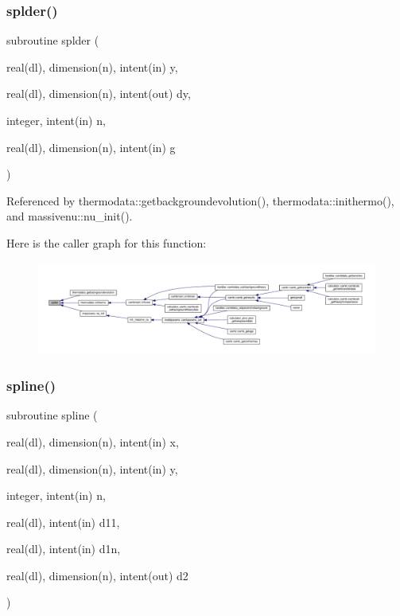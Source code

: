 \mbox{\label{subroutines_8f90_ac08193bbb8f878a435cf0e52c491ad9c}} 
\subsubsection{\texorpdfstring{splder()}{splder()}}
{\footnotesize\ttfamily subroutine splder (\begin{DoxyParamCaption}\item[{real(dl), dimension(n), intent(in)}]{y,  }\item[{real(dl), dimension(n), intent(out)}]{dy,  }\item[{integer, intent(in)}]{n,  }\item[{real(dl), dimension(n), intent(in)}]{g }\end{DoxyParamCaption})}



Referenced by thermodata\+::getbackgroundevolution(), thermodata\+::inithermo(), and massivenu\+::nu\+\_\+init().

Here is the caller graph for this function\+:
\nopagebreak
\begin{figure}[H]
\begin{center}
\leavevmode
\includegraphics[width=350pt]{subroutines_8f90_ac08193bbb8f878a435cf0e52c491ad9c_icgraph}
\end{center}
\end{figure}
\mbox{\label{subroutines_8f90_af4fbf8a987590628c9a9d08152ce9e08}} 
\subsubsection{\texorpdfstring{spline()}{spline()}}
{\footnotesize\ttfamily subroutine spline (\begin{DoxyParamCaption}\item[{real(dl), dimension(n), intent(in)}]{x,  }\item[{real(dl), dimension(n), intent(in)}]{y,  }\item[{integer, intent(in)}]{n,  }\item[{real(dl), intent(in)}]{d11,  }\item[{real(dl), intent(in)}]{d1n,  }\item[{real(dl), dimension(n), intent(out)}]{d2 }\end{DoxyParamCaption})}




